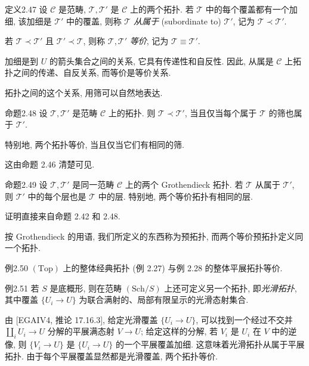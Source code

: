 \begin{origstatement}{定义}{2.47}\label{ch02:def247}
设 $\mathcal C$ 是范畴, $\mathcal T,\mathcal T'$ 是 $\mathcal C$ 上的两个拓扑. 若 $\mathcal T$ 中的每个覆盖都有一个加细, 该加细是 $\mathcal T'$ 中的覆盖, 则称 $\mathcal T$ \emph{从属于} (subordinate to) $\mathcal T'$, 记为 $\mathcal T\prec\mathcal T'$.

若 $\mathcal T\prec\mathcal T'$ 且 $\mathcal T'\prec\mathcal T$, 则称 $\mathcal T,\mathcal T'$ \emph{等价}, 记为 $\mathcal T\equiv\mathcal T'$.
\end{origstatement}

加细是到 $U$ 的箭头集合之间的关系, 它具有传递性和自反性. 因此, 从属是 $\mathcal C$ 上拓扑之间的传递、自反关系, 而等价是等价关系.

拓扑之间的这个关系, 用筛可以自然地表达.

\begin{origstatement}{命题}{2.48}\label{ch02:prop248}
设 $\mathcal T,\mathcal T'$ 是范畴 $\mathcal C$ 上的拓扑. 则 $\mathcal T\prec\mathcal T'$, 当且仅当每个属于 $\mathcal T$ 的筛也属于 $\mathcal T'$.

特别地, 两个拓扑等价, 当且仅当它们有相同的筛.
\end{origstatement}

这由命题 2.46 清楚可见.

\begin{origstatement}{命题}{2.49}\label{ch02:prop249}
设 $\mathcal T,\mathcal T'$ 是同一范畴 $\mathcal C$ 上的两个 Grothendieck 拓扑. 若 $\mathcal T$ 从属于 $\mathcal T'$, 则 $\mathcal T'$ 中的每个层也是 $\mathcal T$ 中的层. 特别地, 两个等价拓扑有相同的层.
\end{origstatement}

证明直接来自命题 2.42 和 2.48.

按 Grothendieck 的用语, 我们所定义的东西称为预拓扑, 而两个等价预拓扑定义同一个拓扑.

\begin{origstatement}{例}{2.50}\label{ch02:ex250}
$(\mathrm{Top})$ 上的整体经典拓扑 (例 2.27) 与例 2.28 的整体平展拓扑等价.
\end{origstatement}

\begin{origstatement}{例}{2.51}\label{ch02:ex251}
若 $S$ 是底概形, 则在范畴 $(\mathrm{Sch}/S)$ 上还可定义另一个拓扑, 即\emph{光滑拓扑}, 其中覆盖 $\{U_i\to U\}$ 为联合满射的、局部有限呈示的光滑态射集合.

由 [EGAIV4, 推论 17.16.3], 给定光滑覆盖 $\{U_i\to U\}$, 可以找到一个经过不交并 $\coprod_iU_i\to U$ 分解的平展满态射 $V\to U$; 给定这样的分解, 若 $V_i$ 是 $U_i$ 在 $V$ 中的逆像, 则 $\{V_i\to U\}$ 是 $\{U_i\to U\}$ 的一个平展覆盖加细. 这意味着光滑拓扑从属于平展拓扑. 由于每个平展覆盖显然都是光滑覆盖, 两个拓扑等价.
\end{origstatement}

